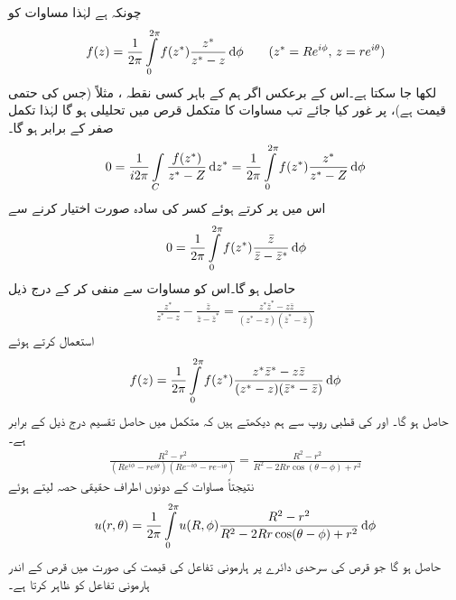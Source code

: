 چونکہ  ہے لہٰذا مساوات  کو 
\begin{align}\label{مساوات_مخفی_معمہ_ب}
f(z)=\frac{1}{2\pi}\int\limits_{0}^{2\pi} f(z^*)\frac{z^*}{z^*-z}\dif \phi\quad \quad (z^*=Re^{i\phi},\,z=re^{i\theta})
\end{align}
لکھا جا سکتا ہے۔اس کے برعکس اگر ہم  کے باہر کسی نقطہ ، مثلاً  (جس کی حتمی قیمت  ہے)، پر غور کیا جائے  تب مساوات  کا متکمل قرص  میں تحلیلی ہو گا لہٰذا تکمل صفر کے برابر ہو گا۔
\begin{align*}
0=\frac{1}{i2\pi}\int\limits_C \frac{f(z^*)}{z^*-Z}\dif z^*=\frac{1}{2\pi}\int\limits_{0}^{2\pi}f(z^*)\frac{z^*}{z^*-Z}\dif \phi
\end{align*}
اس میں  پر کرتے ہوئے  کسر کی سادہ صورت اختیار کرنے سے
\begin{align*}
0=\frac{1}{2\pi}\int\limits_{0}^{2\pi} f(z^*)\frac{\bar{z}}{\bar{z}-\bar{z}^*}\dif\phi
\end{align*}
حاصل ہو گا۔اس کو مساوات  سے منفی کر کے درج ذیل
\begin{align}\label{مساوات_مخفی_معمہ_پ}
\frac{z^*}{z^*-z}-\frac{\bar{z}}{\bar{z}-\bar{z}^*}=\frac{z^*\bar{z}^*-z\bar{z}}{(z^*-z)(\bar{z}^*-\bar{z})}
\end{align}
استعمال کرتے ہوئے 
\begin{align}\label{مساوات_مخفی_معمہ_ت}
f(z)=\frac{1}{2\pi}\int\limits_{0}^{2\pi}f(z^*)\frac{z^*\bar{z}^*-z\bar{z}}{(z^*-z)(\bar{z}^*-\bar{z})}\dif \phi
\end{align}
حاصل ہو گا۔ اور  کی قطبی روپ سے ہم دیکھتے ہیں کہ متکمل میں حاصل تقسیم درج ذیل کے برابر ہے۔
\begin{align*}
\frac{R^2-r^2}{(Re^{i\phi}-re^{i\theta})(Re^{-i\phi}-re^{-i\theta})}=\frac{R^2-r^2}{R^2-2Rr\cos(\theta-\phi)+r^2}
\end{align*}
نتیجتاً مساوات  کے دونوں اطراف حقیقی حصہ لیتے ہوئے 
\begin{align}\label{مساوات_مخفی_معمہ_ٹ}
u(r,\theta)=\frac{1}{2\pi}\int\limits_{0}^{2\pi} u(R,\phi) \frac{R^2-r^2}{R^2-2Rr\cos(\theta-\phi)+r^2} \dif \phi
\end{align}
حاصل ہو گا جو قرص  کی سرحدی دائرے پر ہارمونی تفاعل کی قیمت  کی صورت میں قرص کے اندر  ہارمونی تفاعل  کو ظاہر کرتا ہے۔

